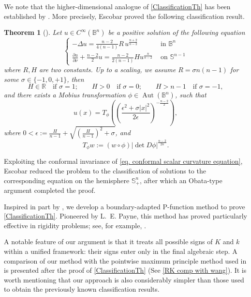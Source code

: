 \documentclass[11pt,a4paper,twoside]{amsart}
\newtheorem{theorem}{Theorem} [section]
\newtheorem{sketch proof}{Sketch of the proof}[section]
\begin{document}
We note that the higher-dimensional analogue of \cref{ClassificationTh} has been established by \cite{Esc90}. More precisely, Escobar proved the following classification result.
\begin{theorem}[\cite{Esc90}]
\label{thm. Escobar classification}
     Let $u \in C^{\infty}\left(\mathbb{B}^n\right)$ be a positive solution of the following equation
    \begin{equation}
    \label{eq. conformal scalar curvature equation}
        \begin{cases}\displaystyle{-\Delta u=\frac{n-2}{4(n-1)} R\, u^{\frac{n+2}{n-2}}}& \text { in } \mathbb{B}^n \\[4mm] 
    \displaystyle{\frac{\partial u}{\partial \nu}+\frac{n-2}{2} u=\frac{n-2}{2(n-1)} H u^{\frac{n}{n-2}}}& \text { on } \mathbb{S}^{n-1}
    \end{cases}
    \end{equation}
 where $R,H$ are two constants. Up to a scaling, we assume $R=\sigma n(n-1)$ for some $\sigma\in\{-1,0, +1\}$, then
 \[
 H\in\mathbb{R}\quad \text{if }\sigma=1;\qquad
 H>0\quad \text{if }\sigma=0;\qquad 
 H>n-1\quad \text{if }\sigma=-1,
 \]
 and there exists a Mobius transformation $\phi\in \operatorname{Aut}(\mathbb{B}^n)$, such that
 \[
 u(x)=T_\phi
 \left(\left(\frac{\epsilon^2+\sigma|x|^2}{2\epsilon}\right)^{-\frac{n-2}{2}}\right),
 \]
 where 
 $0<\epsilon:=\frac{H}{n-1}+\sqrt{\left(\frac{H}{n-1}\right)^2+\sigma}$, and
 \[
 T_\phi w:=(w\circ\phi) |\operatorname{det}D\phi|^{\frac{n-2}{2n}}.
 \]
\end{theorem}
Exploiting the conformal invariance of \cref{eq. conformal scalar curvature equation}, Escobar reduced the problem to the classification of solutions to the corresponding equation on the hemisphere $\mathbb{S}^n_+$, after which an Obata-type argument \cite{Oba71} completed the proof.

Inspired in part by \cite{Esc90}, we develop a boundary-adapted P-function method to prove \cref{ClassificationTh}.
Pioneered by L.~E. Payne, this method has proved particularly effective in rigidity problems; see, for example, \cite{Pay68,Wei71,CFP24,Cai26}.

A notable feature of our argument is that it treats all possible signs of $K$ and $k$ within a unified framework: their signs enter only in the final algebraic step. A comparison of our method with the pointwise maximum principle method used in \cite[Theorem 2]{Wang2017} is presented after the proof of \cref{ClassificationTh} (See \cref{RK comp with wang}). It is worth mentioning that our approach is also considerably simpler than those used to obtain the previously known classification results.
\vspace{1em}
\end{document}
